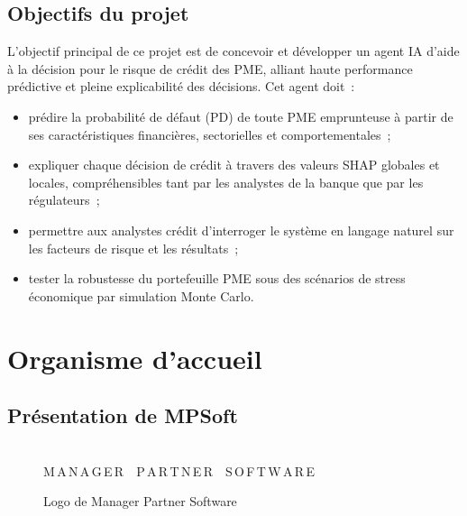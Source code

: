 \documentclass[a4paper,12pt,oneside]{report}
\begin{document}
\subsection{Objectifs du projet}

L'objectif principal de ce projet est de concevoir et développer un agent IA
d'aide à la décision pour le risque de crédit des PME, alliant haute performance prédictive
et pleine explicabilité des décisions. Cet agent doit~:

\begin{itemize}
  \item prédire la probabilité de défaut (PD) de toute PME emprunteuse à partir de ses
        caractéristiques financières, sectorielles et comportementales~;
  \item expliquer chaque décision de crédit à travers des valeurs SHAP globales et locales,
        compréhensibles tant par les analystes de la banque que par les régulateurs~;
  \item permettre aux analystes crédit d'interroger le système en langage naturel sur les
        facteurs de risque et les résultats~;
  \item tester la robustesse du portefeuille PME sous des scénarios de stress économique
        par simulation Monte Carlo.
\end{itemize}

\section{Organisme d'accueil}

\subsection{Présentation de MPSoft}

\begin{figure}[H]
  \centering
  \\[0.18cm]
  {\footnotesize\sffamily\color{gray!70}%
    M\,A\,N\,A\,G\,E\,R~~P\,A\,R\,T\,N\,E\,R~~S\,O\,F\,T\,W\,A\,R\,E}
  \caption{Logo de Manager Partner Software}
  \label{fig:logo_mpsoft}
\end{figure}
\end{document}
